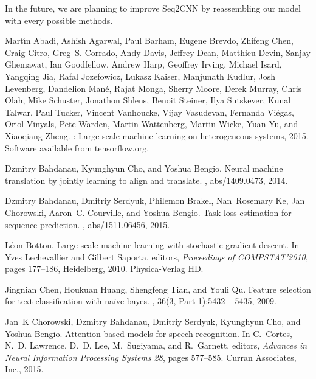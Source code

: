 \documentclass{article}
\begin{document}
In the future, we are planning to improve Seq2CNN by reassembling our model with every possible methods.



\begin{thebibliography}{10}

Mart\'{\i}n Abadi, Ashish Agarwal, Paul Barham, Eugene Brevdo, Zhifeng Chen,
  Craig Citro, Greg~S. Corrado, Andy Davis, Jeffrey Dean, Matthieu Devin,
  Sanjay Ghemawat, Ian Goodfellow, Andrew Harp, Geoffrey Irving, Michael Isard,
  Yangqing Jia, Rafal Jozefowicz, Lukasz Kaiser, Manjunath Kudlur, Josh
  Levenberg, Dandelion Man\'{e}, Rajat Monga, Sherry Moore, Derek Murray, Chris
  Olah, Mike Schuster, Jonathon Shlens, Benoit Steiner, Ilya Sutskever, Kunal
  Talwar, Paul Tucker, Vincent Vanhoucke, Vijay Vasudevan, Fernanda Vi\'{e}gas,
  Oriol Vinyals, Pete Warden, Martin Wattenberg, Martin Wicke, Yuan Yu, and
  Xiaoqiang Zheng.
: Large-scale machine learning on heterogeneous systems,
  2015.
\newblock Software available from tensorflow.org.

Dzmitry Bahdanau, Kyunghyun Cho, and Yoshua Bengio.
\newblock Neural machine translation by jointly learning to align and
  translate.
, abs/1409.0473, 2014.

Dzmitry Bahdanau, Dmitriy Serdyuk, Philemon Brakel, Nan~Rosemary Ke, Jan
  Chorowski, Aaron~C. Courville, and Yoshua Bengio.
\newblock Task loss estimation for sequence prediction.
, abs/1511.06456, 2015.

L{\'e}on Bottou.
\newblock Large-scale machine learning with stochastic gradient descent.
\newblock In Yves Lechevallier and Gilbert Saporta, editors, {\em Proceedings
  of COMPSTAT'2010}, pages 177--186, Heidelberg, 2010. Physica-Verlag HD.

Jingnian Chen, Houkuan Huang, Shengfeng Tian, and Youli Qu.
\newblock Feature selection for text classification with naïve bayes.
, 36(3, Part 1):5432 -- 5435,
  2009.

Jan~K Chorowski, Dzmitry Bahdanau, Dmitriy Serdyuk, Kyunghyun Cho, and Yoshua
  Bengio.
\newblock Attention-based models for speech recognition.
\newblock In C.~Cortes, N.~D. Lawrence, D.~D. Lee, M.~Sugiyama, and R.~Garnett,
  editors, {\em Advances in Neural Information Processing Systems 28}, pages
  577--585. Curran Associates, Inc., 2015.


\end{thebibliography}
\end{document}
